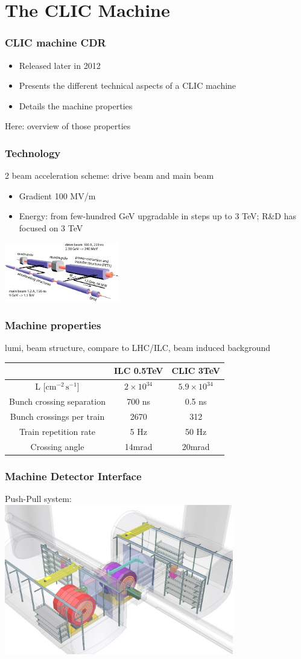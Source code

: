 \documentclass{beamer}
\begin{document}
\section[CLIC]{The CLIC Machine}
\begin{frame}
\frametitle{CLIC machine CDR}
\begin{itemize}
  \item Released later in 2012
  \item Presents the different technical aspects of a CLIC machine
  \item Details the machine properties
\end{itemize}
Here: overview of those properties
\end{frame}
\begin{frame}
\frametitle{Technology}
2 beam acceleration scheme: drive beam and main beam
\begin{itemize}
  \item Gradient 100 MV/m
  \item Energy: from few-hundred GeV upgradable in steps up to 3 TeV; R\&D has
  focused on 3 TeV
\end{itemize}
\includegraphics[width=5cm]{clicacceleration.png}
\end{frame}
\begin{frame}
\frametitle{Machine properties}
lumi, beam structure, compare to LHC/ILC, beam induced background
\begin{tabular}{ccc}
 & ILC 0.5TeV & CLIC 3TeV\\
 \hline
L [$\textrm{cm}^{-2}\,\textrm{s}^{-1}$] & $2\times 10^{34}$&$5.9\times 10^{34}$ \\
\hline
Bunch crossing separation  & 700 ns & 0.5 ns\\
\hline
Bunch crossings per train & 2670 & 312\\
\hline
Train repetition rate  & 5 Hz & 50 Hz\\
\hline
Crossing angle & 14mrad & 20mrad\\
\hline
\end{tabular}
\end{frame}
\begin{frame}
\frametitle{Machine Detector Interface}
Push-Pull system:\\
\includegraphics[width=10cm]{PushPull.png}
\end{frame}
\end{document}
